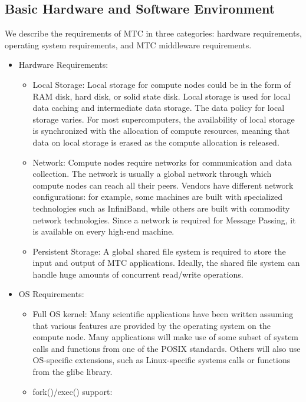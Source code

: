 \documentclass[10pt,letterpaper]{article}
\begin{document}
\subsection{Basic Hardware and Software Environment}
\label{sect:basicreq}

We describe the requirements of MTC in three categories: hardware requirements, operating system requirements, and MTC middleware requirements.

\begin{itemize}
    \item Hardware Requirements:
      \begin{itemize}
	\item Local Storage: 
	  Local storage for compute nodes could be in the form of RAM disk, hard disk, or solid state disk. Local storage is used for local data caching and intermediate data storage. The data policy for local storage varies. For most supercomputers, the availability of local storage is synchronized with the allocation of compute resources, meaning that data on local storage is erased as the compute allocation is released.
	\item Network: 
	  Compute nodes require networks for communication and data collection. The network is usually a global network through which compute nodes can reach all their peers. Vendors have different network configurations: for example, some machines are built with specialized technologies such as InfiniBand, while others are built with commodity network technologies. Since a network is required for Message Passing, it is available on every high-end machine.
	\item Persistent Storage:
	  A global shared file system is required to store the input and output of MTC applications. Ideally, the shared file system can handle huge amounts of concurrent read/write operations.
      \end{itemize}
    \item OS Requirements:
      \begin{itemize}
        \item Full OS kernel:
	  Many scientific applications have been written assuming
          that various features are provided by the operating system on the
          compute node.
          Many applications will make use of some subset of
          system calls and functions from one of the POSIX standards.
          Others will also use OS-specific extensions, such as
          Linux-specific systems calls or functions from the glibc library.
	\item fork()/exec() support:

\end{itemize}
\end{itemize}
\end{document}
